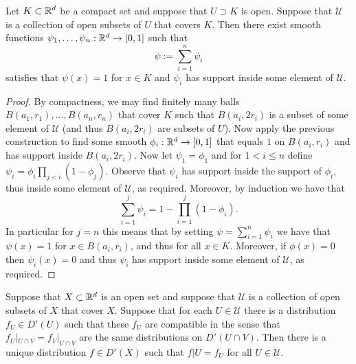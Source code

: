 \documentclass[twoside, a4paper, 10pt]{amsart}
\begin{document}
\begin{prop} Let $K \subset \mathbb{R}^d$ be a compact set and suppose that $U \supset K$ is open. Suppose that $\mathcal{U}$ is a collection of open subsets of $U$ that covers $K$. Then there exist smooth functions $\psi_1, \ldots, \psi_n:\mathbb{R}^d \to [0,1]$ such that $$\psi := \sum_{i=1}^n \psi_i$$ satisfies that $\psi(x)=1$ for $x \in K$ and $\psi_i$ has support inside some element of $\mathcal{U}$.

\end{prop}

\begin{proof} By compactness, we may find finitely many balls $B(a_1,r_1), \ldots , B(a_n,r_n)$ that cover $K$ such that $B(a_i,2r_i)$ is a subset of some element of $\mathcal{U}$ (and thus $B(a_i, 2r_i)$ are subsets of $U$). Now apply the previous construction to find some smooth $\phi_i:\mathbb{R}^d \to [0,1]$ that equals $1$ on $B(a_i,r_i)$ and has support inside $B(a_i,2r_i)$. Now let $\psi_1 = \phi_1$ and for $1<i\leq n$ define $\psi_i = \phi_i \prod_{j<i} (1 - \phi_j)$. Observe that $\psi_i$ has support inside the support of $\phi_i$, thus inside some element of $\mathcal{U}$, as required. Moreover, by induction we have that $$\sum_{i=1}^j \psi_i = 1 - \prod_{i=1}^j (1-\phi_i).$$ In particular for $j=n$ this means that by setting $\psi = \sum_{i=1}^n \psi_i$ we have that $\psi(x) = 1$ for $x \in B(a_ i, r_i)$, and thus for all $x \in K$. Moreover, if $\phi(x)=0$ then $\psi_i(x) = 0$ and thus $\psi_i$ has support inside some element of $\mathcal{U}$, as required. \end{proof}

\begin{thm} Suppose that $X \subset \mathbb{R}^d$ is an open set and suppose that $\mathcal{U}$ is a collection of open subsets of $X$ that cover $X$. Suppose that for each $U \in \mathcal{U}$ there is a distribution $f_U \in D'(U)$ such that these $f_U$ are compatible in the sense that $f_U|_{U \cap V} = f_V|_{U \cap V}$ are the same distributions on $D'(U \cap V)$. Then there is a unique distribution $f \in D'(X)$ such that $f|U = f_U$ for all $U \in \mathcal{U}$.

\end{thm}
\end{document}
